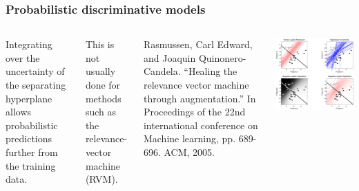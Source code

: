 \begin{frame}
\frametitle{Probabilistic discriminative models}
\begin{columns}[c]
Integrating over the uncertainty of the separating hyperplane allows probabilistic predictions further from the training data.\par
This is not usually done for methods such as the relevance-vector machine (RVM).\par
\vspace{0.25cm}
\begin{tiny}
Rasmussen, Carl Edward, and Joaquin Quinonero-Candela. ``Healing the relevance vector machine through augmentation.'' In Proceedings of the 22nd international conference on Machine learning, pp. 689-696. ACM, 2005.\par
\end{tiny}
\includegraphics[width=\textwidth]{logistic_regr}
\end{columns}
\end{frame}

